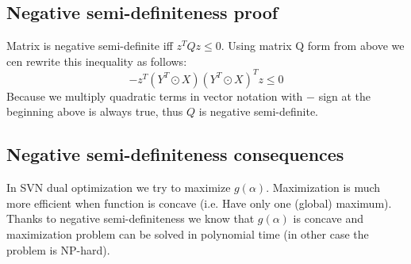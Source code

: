 \documentclass{article}
\begin{document}
\subsection{Negative semi-definiteness proof}
Matrix is negative semi-definite iff $z^TQz \leq 0$. Using matrix Q form from above
we cen rewrite this inequality as follows:
\begin{equation}
    - z^T(Y^T \odot X)(Y^T \odot X)^Tz \leq 0 
\end{equation}
Because we multiply quadratic terms in vector notation with $-$ sign at the beginning 
above is always true, thus $Q$ is negative semi-definite.
\subsection{Negative semi-definiteness consequences}
In SVN dual optimization we try to maximize $g(\alpha)$. Maximization is much
more efficient when function is concave (i.e. Have only one (global) maximum). 
Thanks to negative semi-definiteness we know that $g(\alpha)$ is concave and 
maximization problem can be solved in polynomial time (in other case the problem is NP-hard).
\end{document}
